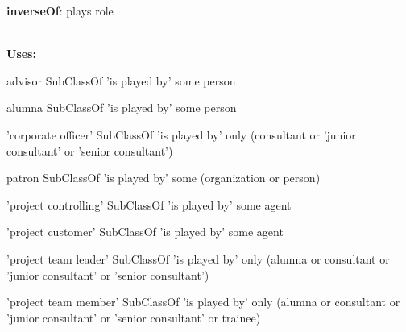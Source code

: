 \documentclass[a4paper, DIV=13, BCOR=0cm]{scrbook}
\begin{document}
\begin{mdframed}[style=onto, frametitle={is played by}]
	{%
		\begin{compactitem}
			\item \textbf{inverseOf}: plays role
		\end{compactitem}
		\hrulefill\\
		\textbf{Uses:}
		\begin{compactitem}
			\item advisor SubClassOf 'is played by' some person
			\item alumna SubClassOf 'is played by' some person
			\item 'corporate officer' SubClassOf 'is played by' only 
			(consultant or 'junior consultant' or 'senior consultant')
			\item patron SubClassOf 'is played by' some 
			(organization or person)
			\item 'project controlling' SubClassOf 'is played by' some agent
			\item 'project customer' SubClassOf 'is played by' some agent
			\item 'project team leader' SubClassOf 'is played by' only 
			(alumna or consultant or 'junior consultant' or 'senior consultant')
			\item 'project team member' SubClassOf 'is played by' only 
			(alumna or consultant or 'junior consultant' or 'senior consultant' or trainee)
		\end{compactitem}
	} %
\end{mdframed}
\end{document}
